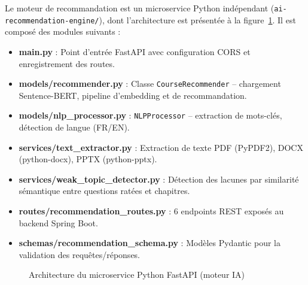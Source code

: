 \documentclass[12pt,a4paper]{report}
\begin{document}
Le moteur de recommandation est un microservice Python indépendant (\texttt{ai-recommendation-engine/}), dont l'architecture est présentée à la figure~\ref{fig:ai_archi}. Il est composé des modules suivants :

\begin{itemize}
  \item \textbf{main.py} : Point d'entrée FastAPI avec configuration CORS et enregistrement des routes.
  \item \textbf{models/recommender.py} : Classe \texttt{CourseRecommender} -- chargement Sentence-BERT, pipeline d'embedding et de recommandation.
  \item \textbf{models/nlp\_processor.py} : \texttt{NLPProcessor} -- extraction de mots-clés, détection de langue (FR/EN).
  \item \textbf{services/text\_extractor.py} : Extraction de texte PDF (PyPDF2), DOCX (python-docx), PPTX (python-pptx).
  \item \textbf{services/weak\_topic\_detector.py} : Détection des lacunes par similarité sémantique entre questions ratées et chapitres.
  \item \textbf{routes/recommendation\_routes.py} : 6 endpoints REST exposés au backend Spring Boot.
  \item \textbf{schemas/recommendation\_schema.py} : Modèles Pydantic pour la validation des requêtes/réponses.
\end{itemize}

\begin{figure}[H]
\centering
{}
\caption{Architecture du microservice Python FastAPI (moteur IA)}
\label{fig:ai_archi}
\end{figure}
\end{document}
